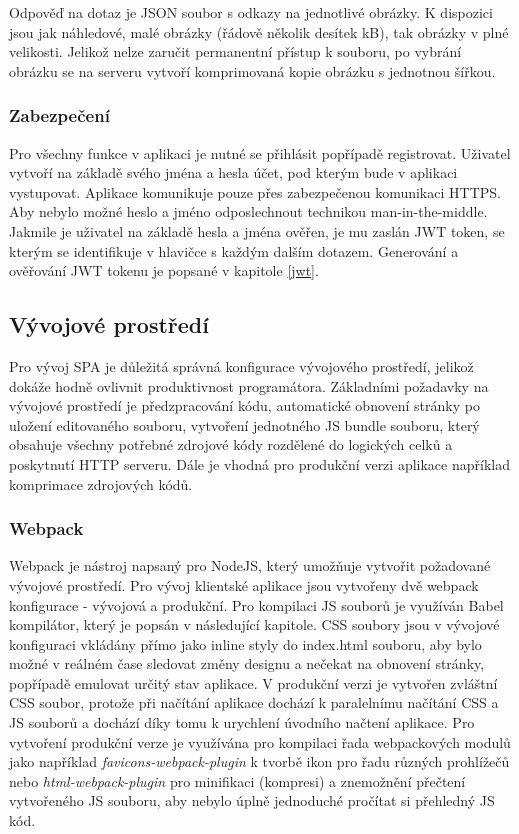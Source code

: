 \documentclass[a4paper,11pt,titlepage,fleqn]{article}
\begin{document}
            Odpověď na dotaz je JSON soubor s odkazy na jednotlivé obrázky. K dispozici jsou jak náhledové, malé obrázky (řádově několik desítek kB), tak obrázky v plné velikosti. Jelikož nelze zaručit permanentní přístup k souboru, po vybrání obrázku se na serveru vytvoří komprimovaná kopie obrázku s jednotnou šířkou. 

        \subsubsection{Zabezpečení}
            Pro všechny funkce v aplikaci je nutné se přihlásit popřípadě registrovat. Uživatel vytvoří na základě svého jména a hesla účet, pod kterým bude v aplikaci vystupovat. Aplikace komunikuje pouze přes zabezpečenou komunikaci HTTPS. Aby nebylo možné heslo a jméno odposlechnout technikou man-in-the-middle. Jakmile je uživatel na základě hesla a jména ověřen, je mu zaslán JWT token, se kterým se identifikuje v hlavičce s každým dalším dotazem. Generování a ověřování JWT tokenu je popsané v kapitole \ref{jwt}.

    \subsection{Vývojové prostředí}
        Pro vývoj SPA je důležitá správná konfigurace vývojového prostředí, jelikož dokáže hodně ovlivnit produktivnost programátora. Základními požadavky na vývojové prostředí je předzpracování kódu, automatické obnovení stránky po uložení editovaného souboru, vytvoření jednotného JS bundle souboru, který obsahuje všechny potřebné zdrojové kódy rozdělené do logických celků a poskytnutí HTTP serveru. Dále je vhodná pro produkční verzi aplikace například komprimace zdrojových kódů.

        \subsubsection{Webpack}
            Webpack je nástroj napsaný pro NodeJS, který umožňuje vytvořit požadované vývojové prostředí. Pro vývoj klientské aplikace jsou vytvořeny dvě webpack konfigurace - vývojová a produkční. Pro kompilaci JS souborů je využíván Babel kompilátor, který je popsán v následující kapitole. CSS soubory jsou v vývojové konfiguraci vkládány přímo jako inline styly do index.html souboru, aby bylo možné v reálném čase sledovat změny designu a nečekat na obnovení stránky, popřípadě emulovat určitý stav aplikace. V produkční verzi je vytvořen zvláštní CSS soubor, protože při načítání aplikace dochází k paralelnímu načítání CSS a JS souborů a dochází díky tomu k urychlení úvodního načtení aplikace. Pro vytvoření produkční verze je využívána pro kompilaci řada webpackových modulů jako například \textit{favicons-webpack-plugin} k tvorbě ikon pro řadu různých prohlížečů nebo \textit{html-webpack-plugin} pro minifikaci (kompresi) a znemožnění přečtení vytvořeného JS souboru, aby nebylo úplně jednoduché pročítat si přehledný JS kód\cite{bib:webpack}.
\end{document}
